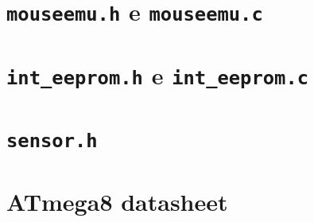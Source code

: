 \documentclass[brazil,pagestart=firstchapter]{abnt}
\begin{document}
\chapter{\texttt{mouseemu.h} e \texttt{mouseemu.c}}
\label{ape:mouseemu}

\clearpage



\chapter{\texttt{int\_eeprom.h} e \texttt{int\_eeprom.c}}
\label{ape:int_eeprom}




\chapter{\texttt{sensor.h}}
\label{ape:sensor}

%

%
%
%
%
%
%
%
%
%
%


\anexo


\chapter{ATmega8 datasheet}
\label{anx:atmega8_datasheet}
\end{document}
